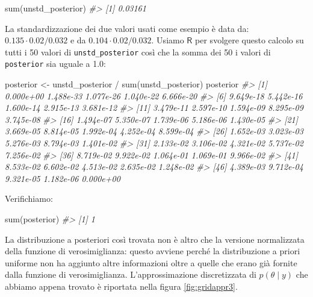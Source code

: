 \documentclass[
  11pt,
]{krantz}
\makeatletter
\newenvironment{Shaded}{\begin{snugshade}}{\end{snugshade}}
\newcommand{\CommentTok}[1]{\textcolor[rgb]{0.37,0.37,0.37}{\textit{#1}}}
\newcommand{\FunctionTok}[1]{\textcolor[rgb]{0,0,0}{#1}}
\newcommand{\NormalTok}[1]{#1}
\newcommand{\OtherTok}[1]{\textcolor[rgb]{0.37,0.37,0.37}{#1}}
\newcommand{\SpecialCharTok}[1]{\textcolor[rgb]{0,0,0}{#1}}
\newenvironment{kframe}{%
\medskip{}
\setlength{\fboxsep}{.8em}
 \def\at@end@of@kframe{}%
 \ifinner\ifhmode%
  \def\at@end@of@kframe{\end{minipage}}%
  \begin{minipage}{\columnwidth}%
 \fi\fi%
 \def\FrameCommand##1{\hskip\@totalleftmargin \hskip-\fboxsep
 \colorbox{shadecolor}{##1}\hskip-\fboxsep
     \hskip-\linewidth \hskip-\@totalleftmargin \hskip\columnwidth}%
 \MakeFramed {\advance\hsize-\width
   \@totalleftmargin\z@ \linewidth\hsize
   \@setminipage}}%
 {\par\unskip\endMakeFramed%
 \at@end@of@kframe}
\renewenvironment{Shaded}{\begin{kframe}}{\end{kframe}}
\newcommand{\R}{\textsf{R}} %
\theoremstyle{definition}
\theoremstyle{definition}
\theoremstyle{definition}
\theoremstyle{definition}
\theoremstyle{remark}
\makeatother
\begin{document}
\begin{Shaded}
\begin{Highlighting}[]
\FunctionTok{sum}\NormalTok{(unstd\_posterior)}
\CommentTok{\#\textgreater{} [1] 0.03161}
\end{Highlighting}
\end{Shaded}

La standardizzazione dei due valori usati come esempio è data da: \(0.135 \cdot 0.02 / 0.032\) e da \(0.104 \cdot 0.02 / 0.032\). Usiamo \(\R\) per svolgere questo calcolo su tutti i 50 valori di \texttt{unstd\_posterior} così che la somma dei 50 i valori di \texttt{posterior} sia uguale a 1.0:

\begin{Shaded}
\begin{Highlighting}[]
\NormalTok{posterior }\OtherTok{\textless{}{-}}\NormalTok{ unstd\_posterior }\SpecialCharTok{/} \FunctionTok{sum}\NormalTok{(unstd\_posterior)}
\NormalTok{posterior}
\CommentTok{\#\textgreater{}  [1] 0.000e+00 1.488e{-}33 1.077e{-}26 1.040e{-}22 6.666e{-}20}
\CommentTok{\#\textgreater{}  [6] 9.649e{-}18 5.442e{-}16 1.600e{-}14 2.915e{-}13 3.681e{-}12}
\CommentTok{\#\textgreater{} [11] 3.479e{-}11 2.597e{-}10 1.594e{-}09 8.295e{-}09 3.745e{-}08}
\CommentTok{\#\textgreater{} [16] 1.494e{-}07 5.350e{-}07 1.739e{-}06 5.186e{-}06 1.430e{-}05}
\CommentTok{\#\textgreater{} [21] 3.669e{-}05 8.814e{-}05 1.992e{-}04 4.252e{-}04 8.599e{-}04}
\CommentTok{\#\textgreater{} [26] 1.652e{-}03 3.023e{-}03 5.276e{-}03 8.794e{-}03 1.401e{-}02}
\CommentTok{\#\textgreater{} [31] 2.133e{-}02 3.106e{-}02 4.321e{-}02 5.737e{-}02 7.256e{-}02}
\CommentTok{\#\textgreater{} [36] 8.719e{-}02 9.922e{-}02 1.064e{-}01 1.069e{-}01 9.966e{-}02}
\CommentTok{\#\textgreater{} [41] 8.533e{-}02 6.602e{-}02 4.513e{-}02 2.635e{-}02 1.248e{-}02}
\CommentTok{\#\textgreater{} [46] 4.389e{-}03 9.712e{-}04 9.321e{-}05 1.182e{-}06 0.000e+00}
\end{Highlighting}
\end{Shaded}

Verifichiamo:

\begin{Shaded}
\begin{Highlighting}[]
\FunctionTok{sum}\NormalTok{(posterior)}
\CommentTok{\#\textgreater{} [1] 1}
\end{Highlighting}
\end{Shaded}

La distribuzione a posteriori così trovata non è altro che la versione normalizzata della funzione di verosimiglianza: questo avviene perché la distribuzione a priori uniforme non ha aggiunto altre informazioni oltre a quelle che erano già fornite dalla funzione di verosimiglianza. L'approssimazione discretizzata di \(p(\theta \mid y)\) che abbiamo appena trovato è riportata nella figura \ref{fig:gridappr3}.
\end{document}
